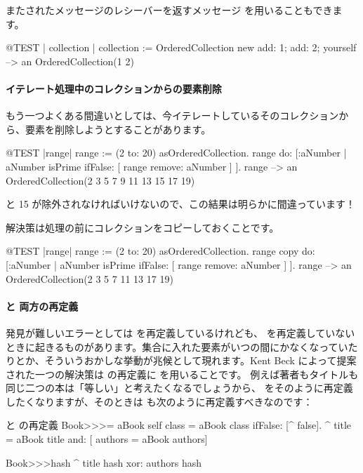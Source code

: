 \documentclass[a4paper,10pt,twoside]{book}
\begin{document}
またされたメッセージのレシーバーを返すメッセージ  を用いることもできます。

\begin{code}{@TEST | collection |}
collection := OrderedCollection new add: 1; add: 2; yourself --> an OrderedCollection(1 2)
\end{code}

\paragraph{イテレート処理中のコレクションからの要素削除} もう一つよくある間違いとしては、今イテレートしているそのコレクションから、要素を削除しようとすることがあります。
\begin{code}{@TEST |range|}
range := (2 to: 20) asOrderedCollection.
range do: [:aNumber | aNumber isPrime ifFalse: [ range remove: aNumber ] ].
range --> an OrderedCollection(2 3 5 7 9 11 13 15 17 19)
\end{code}
 と 15 が除外されなければいけないので、この結果は明らかに間違っています！

解決策は処理の前にコレクションをコピーしておくことです。
\begin{code}{@TEST |range|}
range := (2 to: 20) asOrderedCollection.
range copy do: [:aNumber | aNumber isPrime ifFalse: [ range remove: aNumber ] ].
range --> an OrderedCollection(2 3 5 7 11 13 17 19)
\end{code}

\paragraph{\ct{=} と  両方の再定義}
発見が難しいエラーとしては \ct{=} を再定義しているけれども、 を再定義していないときに起きるものがあります。集合に入れた要素がいつの間にかなくなっていたりとか、そういうおかしな挙動が兆候として現れます。Kent Beck によって提案された一つの解決策は  の再定義に  を用いることです。
例えば著者もタイトルも同じ二つの本は「等しい」と考えたくなるでしょうから、\ct{=} をそのように再定義したくなりますが、そのときは  も次のように再定義すべきなのです：

\begin{method}{\lct{=} と  の再定義}
Book>>>= aBook
   self class = aBook class ifFalse: [^ false].
   ^ title = aBook title and: [ authors = aBook authors]

Book>>>hash 
   ^ title hash xor: authors hash
\end{method}
\end{document}
